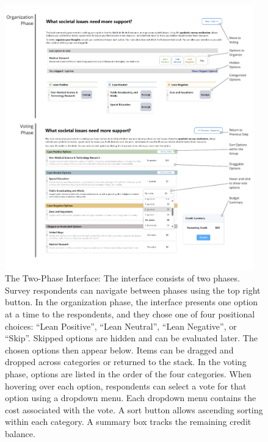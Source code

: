 \begin{figure}[p]
    \centering
    \includegraphics[width=0.96\textwidth]{content/image/detailed.pdf}
    \caption{The Two-Phase Interface: The interface consists of two phases. Survey respondents can navigate between phases using the top right button. In the organization phase, the interface presents one option at a time to the respondents, and they chose one of four positional choices: ``Lean Positive'', ``Lean Neutral'', ``Lean Negative'', or ``Skip''. Skipped options are hidden and can be evaluated later. The chosen options then appear below. Items can be dragged and dropped across categories or returned to the stack. In the voting phase, options are listed in the order of the four categories. When hovering over each option, respondents can select a vote for that option using a dropdown menu. Each dropdown menu contains the cost associated with the vote. A sort button allows ascending sorting within each category. A summary box tracks the remaining credit balance.}
    \label{fig:interactiveInterface}
    \Description{
}
\end{figure}
